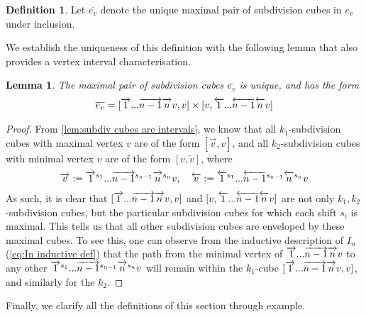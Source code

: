 \documentclass{amsart}
\newtheorem{lemma}[theorem]{Lemma}
\theoremstyle{definition}
\newtheorem{definition}[theorem]{Definition}
\newcommand{\rightshift}[1]{\overrightarrow{\vphantom{1}{#1}}}
\newcommand{\rightshiftk}[2]{\overrightarrow{\vphantom{1}{#1}}^{#2}}
\newcommand{\leftshift}[1]{\overleftarrow{\vphantom{1}{#1}}}
\newcommand{\leftshiftk}[2]{\overleftarrow{\vphantom{1}{#1}}^{#2}}
\newcommand{\subdivpairsv}{e_v}
\newcommand{\maxsubdivpairsv}{\overline{e_v}}
\begin{document}
\begin{definition}\label{def:max subdiv pairs}
Let $\maxsubdivpairsv$ denote the unique maximal pair of subdivision cubes in $\subdivpairsv$ under inclusion.
\end{definition}
We establish the uniqueness of this definition with the following lemma that also provides a vertex interval characterisation.
\begin{lemma} \label{lem:unique interval desc of maximal subdiv pair}
The maximal pair of subdivision cubes $\maxsubdivpairsv$ is unique, and has the form 
\begin{align*}
    \maxsubdivpairsv=[\rightshift{1}... \rightshift{n-1}\rightshift{n}v, v] \times [v, \leftshift{1}...\leftshift{n-1}\leftshift{n}v]
\end{align*}
\end{lemma}
\begin{proof}
From \cref{lem:subdiv cubes are intervals}, we know that all $k_1$-subdivision cubes with maximal vertex $v$ are of the form
$[\overrightarrow{v},v]$, and all $k_2$-subdivision cubes with minimal vertex $v$ are of the form $[{v},\overleftarrow{v}]$, where 
\begin{align*}
    \overrightarrow{v}:= \rightshiftk{1}{s_1}... \rightshiftk{n-1}{s_{n-1}}\rightshiftk{n}{s_n}v, \quad \overleftarrow{v} :=\leftshiftk{1}{s_1}...\leftshiftk{n-1}{s_{n-1}}\leftshiftk{n}{s_n}v
\end{align*}
As such, it is clear that $[\rightshift{1}... \rightshift{n-1}\rightshift{n}v, v] $ and $[v, \leftshift{1}...\leftshift{n-1}\leftshift{n}v]$ are not only $k_1,k_2$-subdivision cubes,
but the particular subdivision cubes for which each shift $s_i$ is maximal.
This tells us that all other subdivision cubes are enveloped by these maximal cubes.
To see this, one can observe from the inductive description of $I_n$ (\cref{eq:In inductive def}) that the path from the minimal vertex of $\rightshift{1}... \rightshift{n-1}\rightshift{n}v$ to any other $\rightshiftk{1}{s_1}... \rightshiftk{n-1}{s_{n-1}}\rightshiftk{n}{s_n}v$ will remain within the $k_1$-cube $[\rightshift{1}... \rightshift{n-1}\rightshift{n}v, v]$, and similarly for the $k_2$.
\end{proof}

Finally, we clarify all the definitions of this section through example.
\end{document}
